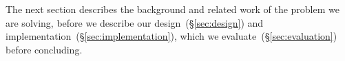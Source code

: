 The next section describes the background and related work of the problem we
are solving, before we describe our design~(\S\ref{sec:design}) and
implementation~(\S\ref{sec:implementation}), which we
evaluate~(\S\ref{sec:evaluation}) before concluding.

